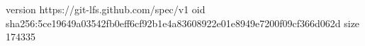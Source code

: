 version https://git-lfs.github.com/spec/v1
oid sha256:5ce19649a03542fb0eff6cf92b1e4a83608922e01e8949e7200f09cf366d062d
size 174335
